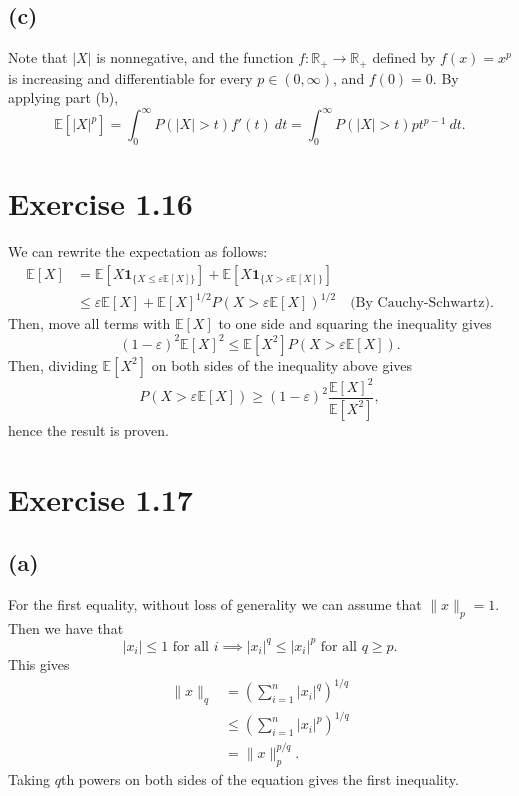 \subsection*{(c)}
Note that $|X|$ is nonnegative, and the function $f: \mathbb{R}_+ \to \mathbb{R}_+$ defined by $f(x) = x^p$ is 
increasing and differentiable for every $p \in (0, \infty)$, and $f(0) = 0$. By applying part (b), 
\[ \mathbb{E}\left[ |X|^p \right] = \int_{0}^{\infty} P(|X| > t)f'(t) \ dt 
= \int_{0}^{\infty} P(|X| > t)pt^{p - 1} \ dt. \]


\newpage
\section*{Exercise 1.16}
We can rewrite the expectation as follows:
\begin{align*}
	\mathbb{E}\left[ X \right] 
	&= \mathbb{E}\left[ X \mathbf{1}_{\{ X \leq \varepsilon \mathbb{E}\left[ X \right] \}} \right] 
	+ \mathbb{E}\left[ X \mathbf{1}_{\{ X > \varepsilon \mathbb{E}\left[ X \right] \}} \right] \\
	&\leq \varepsilon \mathbb{E}\left[ X \right] + \mathbb{E}\left[ X \right]^{1/2} 
	P(X > \varepsilon \mathbb{E}\left[ X \right])^{1/2} \quad \text{(By Cauchy-Schwartz)}.
\end{align*}
Then, move all terms with $\mathbb{E}\left[ X \right]$ to one side and squaring the inequality gives
\[ (1 - \varepsilon)^2 \mathbb{E}\left[ X \right]^2 \leq \mathbb{E}\left[ X^2 \right] 
P(X > \varepsilon \mathbb{E}\left[ X \right]). \]
Then, dividing $\mathbb{E}\left[ X^2 \right]$ on both sides of the inequality above gives 
\[ P(X > \varepsilon \mathbb{E}\left[ X \right]) \geq (1 - \varepsilon)^2 
\frac{\mathbb{E}\left[ X \right]^2}{\mathbb{E}\left[ X^2 \right]}, \]
hence the result is proven.


\newpage
\section*{Exercise 1.17}
\subsection*{(a)}
For the first equality, without loss of generality we can assume that $\lVert x \rVert_{p} = 1$. Then we have 
that 
\[ |x_i| \leq 1 \text{ for all } i \implies |x_i|^q \leq |x_i|^p \text{ for all } q \geq p. \]
This gives 
\begin{align*}
	\lVert x \rVert_{q} 
	&= \left( \sum_{i = 1}^{n} |x_i|^q \right)^{1/q} \\
	&\leq \left( \sum_{i = 1}^{n} |x_i|^p \right)^{1/q} \\
	&= \lVert x \rVert_{p}^{p/q}.
\end{align*}
Taking $q$th powers on both sides of the equation gives the first inequality.

